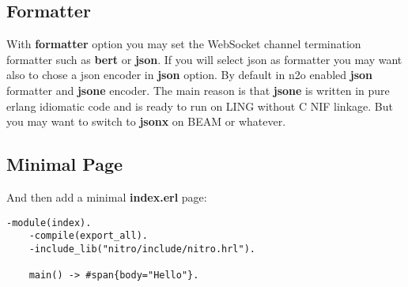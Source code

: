 \subsection*{Formatter}
With {\bf formatter} option you may set the WebSocket channel
termination formatter such as {\bf bert} or {\bf json}. If you will select json as formatter
you may want also to chose a json encoder in {\bf json} option. By default in n2o enabled
{\bf json} formatter and {\bf jsone} encoder. The main reason is that {\bf jsone} is
written in pure erlang idiomatic code and is ready to run on LING without C NIF linkage.
But you may want to switch to {\bf jsonx} on BEAM or whatever.

\subsection*{Minimal Page}
And then add a minimal {\bf index.erl} page:

\vspace{1\baselineskip}
\begin{lstlisting}[caption=index.erl]
    -module(index).
    -compile(export_all).
    -include_lib("nitro/include/nitro.hrl").

    main() -> #span{body="Hello"}.
\end{lstlisting}
\vspace{1\baselineskip}
